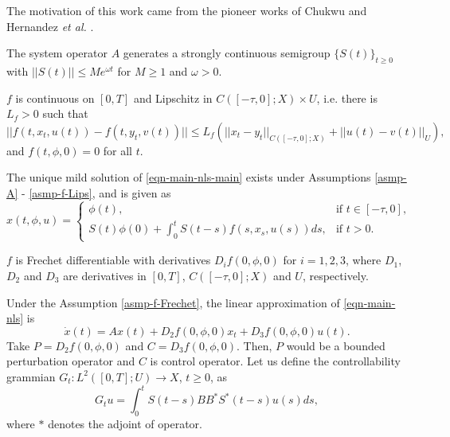 \documentclass[12pt]{llncs}
\begin{document}
The motivation of this work came from the pioneer works of Chukwu \cite{Chukwu91delay} and Hernandez \emph{et al.} \cite{hernandez2020alka}.

\begin{asmp}\label{asmp-A}
The system operator $A$ generates a strongly continuous semigroup $\{S(t)\}_{t \ge 0}$ with $||S(t)|| \le M e^{\omega t}$ for $M \ge 1$ and $\omega > 0$.
\end{asmp}

\begin{asmp}\label{asmp-f-Lips}
$f$ is continuous on $[0,T]$ and Lipschitz in $C([-\tau,0];X) \times U$, i.e. there is $L_f > 0$ such that
        \begin{equation*}
          ||f(t,x_t,u(t)) - f(t,y_t,v(t))|| \le L_f (||x_t - y_t||_{C([-\tau,0];X)} + ||u(t) - v(t)||_U),
        \end{equation*}
                and $f(t,\phi,0)=0$ for all $t$.
\end{asmp}

The unique mild solution of \eqref{eqn-main-nls-main} exists under Assumptions \ref{asmp-A} - \ref{asmp-f-Lips}, and is given as
\begin{equation*}
x(t,\phi,u) = \begin{cases}
                \phi(t), & \mbox{if } t \in [-\tau,0], \\
                S(t)\phi(0) + \int_{0}^{t} S(t-s) f(s,x_s,u(s))ds , & \mbox{if } t > 0.
              \end{cases}
\end{equation*}

\begin{asmp}\label{asmp-f-Frechet}
$f$ is Frechet differentiable %
with derivatives $D_i f(0,\phi,0)$ for $i = 1,2,3$, where $D_1$, $D_2$ and $D_3$ are derivatives in $[0,T]$, $C([-\tau,0];X)$ and $U$, respectively.
\end{asmp}

Under the Assumption \ref{asmp-f-Frechet}, the linear approximation of \eqref{eqn-main-nls} is
\begin{equation}\label{eqn-lin-approx}
\dot{x}(t) = A x(t) + D_2 f(0,\phi,0)x_t + D_3 f(0,\phi,0)u(t).
\end{equation}
Take $P = D_2 f(0,\phi,0)$ and $C = D_3 f(0,\phi,0)$. Then, $P$ would be a bounded perturbation operator and $C$ is control operator. Let us define the controllability grammian $G_t : L^2([0,T];U) \rightarrow X$, $t \ge 0$, as
\begin{equation}\label{eqn-cg-dfn}
G_t u = \int_{0}^{t} S(t-s) B B^* S^*(t-s)u(s)ds,
\end{equation}
where $*$ denotes the adjoint of operator.
\end{document}
